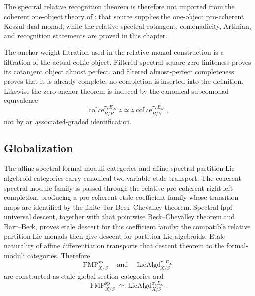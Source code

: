 The spectral relative recognition theorem is therefore not imported from the
coherent one-object theory of \cite{BrantnerCamposNuiten2025}; that source
supplies the one-object pro-coherent Koszul-dual monad, while the relative
spectral cotangent, comonadicity, Artinian, and recognition statements are
proved in this chapter.

The anchor-weight filtration used in the relative monad construction is a
filtration of the actual coLie object.  Filtered spectral square-zero
finiteness proves its cotangent object almost perfect, and filtered
almost-perfect completeness proves that it is already complete; no completion
is inserted into the definition.  Likewise the zero-anchor theorem is induced
by the canonical subcomonad equivalence
\[
    \operatorname{coLie}^{\pi,E_\infty}_{B/R}z
    \simeq
    z\operatorname{coLie}^{\pi,E_\infty}_{B/B},
\]
not by an associated-graded identification.

\subsection{Globalization}

The affine spectral formal-moduli categories and affine spectral
partition-Lie algebroid categories carry canonical two-variable etale
transport.  The coherent spectral module family is passed through the
relative pro-coherent right-left completion, producing a pro-coherent etale
coefficient family whose transition maps are identified by the finite-Tor
Beck--Chevalley theorem.  Spectral fppf universal descent, together with that
pointwise Beck--Chevalley theorem and Barr--Beck, proves etale descent for
this coefficient family; the compatible relative partition-Lie monads then
give descent for
partition-Lie algebroids.  Etale naturality of affine differentiation
transports that descent theorem to the formal-moduli categories.  Therefore
\[
    \operatorname{FMP}^{\mathrm{sp}}_{X/S}
    \quad\text{and}\quad
    \operatorname{LieAlgd}^{\pi,E_\infty}_{X/S}
\]
are constructed as etale global-section categories and
\[
    \operatorname{FMP}^{\mathrm{sp}}_{X/S}
    \simeq
    \operatorname{LieAlgd}^{\pi,E_\infty}_{X/S}.
\]

